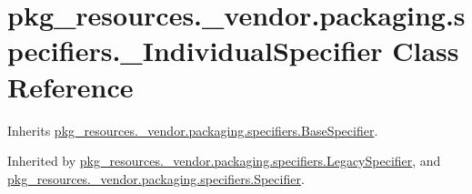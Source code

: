 \hypertarget{classpkg__resources_1_1__vendor_1_1packaging_1_1specifiers_1_1___individual_specifier}{}\section{pkg\+\_\+resources.\+\_\+vendor.\+packaging.\+specifiers.\+\_\+\+Individual\+Specifier Class Reference}
\label{classpkg__resources_1_1__vendor_1_1packaging_1_1specifiers_1_1___individual_specifier}


Inherits \hyperlink{classpkg__resources_1_1__vendor_1_1packaging_1_1specifiers_1_1_base_specifier}{pkg\+\_\+resources.\+\_\+vendor.\+packaging.\+specifiers.\+Base\+Specifier}.



Inherited by \hyperlink{classpkg__resources_1_1__vendor_1_1packaging_1_1specifiers_1_1_legacy_specifier}{pkg\+\_\+resources.\+\_\+vendor.\+packaging.\+specifiers.\+Legacy\+Specifier}, and \hyperlink{classpkg__resources_1_1__vendor_1_1packaging_1_1specifiers_1_1_specifier}{pkg\+\_\+resources.\+\_\+vendor.\+packaging.\+specifiers.\+Specifier}.

